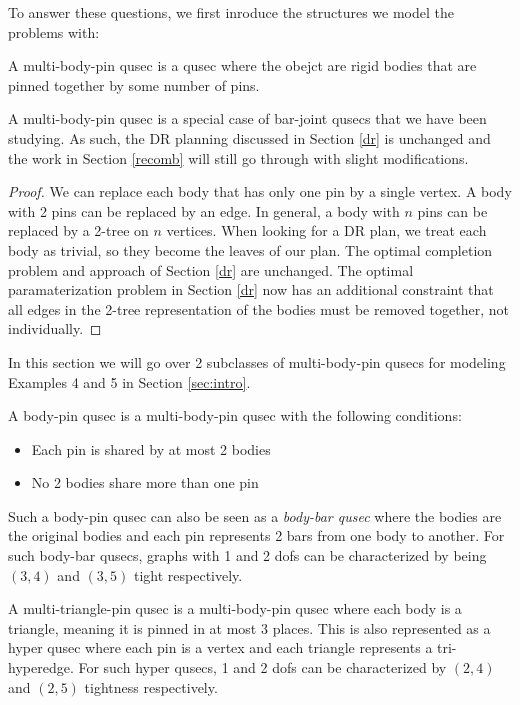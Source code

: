 To answer these questions, we first inroduce the structures we model the problems with:

\begin{definition}
    A multi-body-pin qusec is a qusec where the obejct are rigid bodies that are pinned together by some number of pins.
\end{definition}

\begin{remark}
    A multi-body-pin qusec is a special case of bar-joint qusecs that we have been studying. As such, the DR planning discussed in Section \ref{dr} is unchanged and the work in Section \ref{recomb} will still go through with slight modifications.
\end{remark}

\begin{proof}
    We can replace each body that has only one pin by a single vertex. A body with 2 pins can be replaced by an edge. In general, a body with $n$ pins can be replaced by a 2-tree on $n$ vertices. When looking for a DR plan, we treat each body as trivial, so they become the leaves of our plan. The optimal completion problem and approach of Section \ref{dr} are unchanged. The optimal paramaterization problem in Section \ref{dr} now has an additional constraint that all edges in the 2-tree representation of the bodies must be removed together, not individually.
\end{proof}

In this section we will go over 2 subclasses of multi-body-pin qusecs for modeling Examples 4 and 5 in Section \ref{sec:intro}.

\begin{definition}
\label{def:body-pin}
    A body-pin qusec is a multi-body-pin qusec with the following conditions:
    \begin{itemize}
        \item Each pin is shared by at most 2 bodies
        \item No 2 bodies share more than one pin
    \end{itemize}
    Such a body-pin qusec can also be seen as a {\em body-bar qusec} where the bodies are the original bodies and each pin represents 2 bars from one body to another. For such body-bar qusecs, graphs with 1 and 2 dofs can be characterized by being $(3,4)$ and $(3,5)$ tight respectively.
\end{definition}

\begin{definition}
    A multi-triangle-pin qusec is a multi-body-pin qusec where each body is a triangle, meaning it is pinned in at most 3 places. This is also represented as a hyper qusec where each pin is a vertex and each triangle represents a tri-hyperedge. For such hyper qusecs, 1 and 2 dofs can be characterized by $(2,4)$ and $(2,5)$ tightness respectively.
\end{definition}

